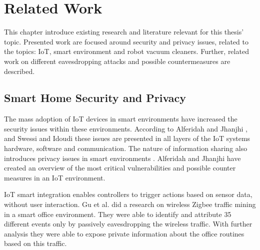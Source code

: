 \chapter{Related Work}
This chapter introduce existing research and literature relevant for this thesis' topic. Presented work are focused around security and privacy issues, related to the topics: IoT, smart environment and robot vacuum cleaners. Further, related work on different eavesdropping attacks and possible countermeasures are described.

\section{Smart Home Security and Privacy}
The mass adoption of IoT devices in smart environments have increased the security issues within these environments. According to Alferidah and Jhanjhi \cite{Iotissues}, and Swessi and  Idoudi \cite{iotissues1} these issues are presented in all layers of the IoT systems hardware, software and communication. The nature of information sharing also introduces privacy issues in smart environments \cite{Iotissues}. Alferidah and Jhanjhi \cite{Iotissues} have created an overview of the most critical vulnerabilities and possible counter measures in an IoT environment. 

IoT smart integration enables controllers to trigger actions based on sensor data, without user interaction. Gu et al. \cite{eavsIoT} did a research on wireless Zigbee traffic mining in a smart office environment. They were able to identify and attribute 35 different events only by passively eavesdropping the wireless traffic. With further analysis they were able to expose private information about the office routines based on this traffic.  

